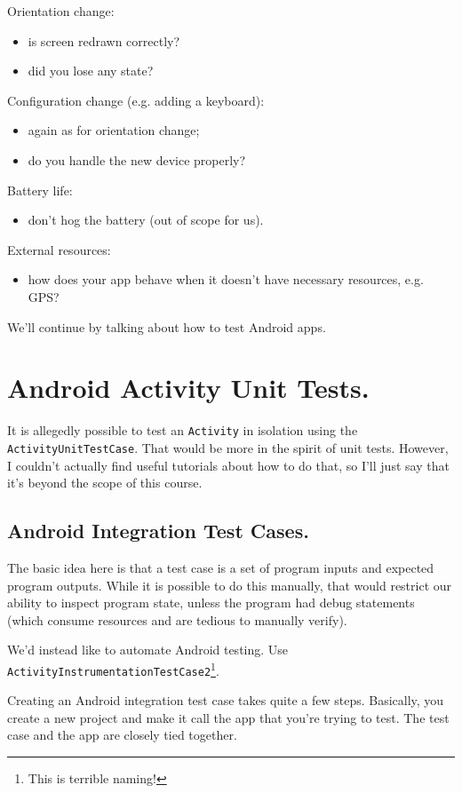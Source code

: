 Orientation change:
\begin{itemize}
\item is screen redrawn correctly?
\item did you lose any state?
\end{itemize}

Configuration change (e.g. adding a keyboard):
\begin{itemize}
\item again as for orientation change;
\item do you handle the new device properly?
\end{itemize}

Battery life:
\begin{itemize}
\item don't hog the battery (out of scope for us).
\end{itemize}

External resources:
\begin{itemize}
\item how does your app behave when it doesn't have
necessary resources, e.g. GPS?
\end{itemize}

We'll continue by talking about how to test Android apps.


\section*{Android Activity Unit Tests.} It is allegedly possible to test an
{\tt Activity} in isolation using the {\tt ActivityUnitTestCase}. That
would be more in the spirit of unit tests. However, I couldn't
actually find useful tutorials about how to do that, so I'll just say
that it's beyond the scope of this course.

\subsection*{Android Integration Test Cases.}
The basic idea here is that a test case is a set of program inputs and
expected program outputs. While it is possible to do this manually,
that would restrict our ability to inspect program state, unless the
program had debug statements (which consume resources and are tedious
to manually verify).

We'd instead like to automate Android testing. Use {\tt ActivityInstrumentationTestCase2}\footnote{This is terrible naming!}.

Creating an Android integration test case takes quite a few steps.
Basically, you create a new project and make it call the app that
you're trying to test. The test case and the app are closely tied together.

